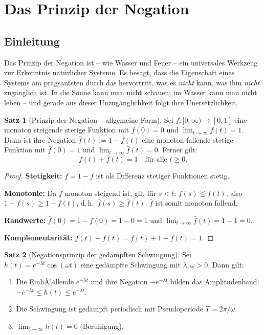 ﻿\documentclass[a4paper,12pt]{article}
\theoremstyle{definition}
\newtheorem{satz}{Satz}
\begin{document}
\section{Das Prinzip der Negation}
\label{sec:negation}

\subsection{Einleitung}

Das Prinzip der Negation ist -- wie Wasser und Feuer -- ein universales Werkzeug
zur Erkenntnis nat\"urlicher Systeme. Es besagt, dass die Eigenschaft eines Systems
am pr\"agsantsten durch das hervortritt, was es \emph{nicht} kann, was ihm
\emph{nicht} zug\"anglich ist. In die Sonne kann man nicht schauen; im Wasser kann
man nicht leben -- und gerade aus dieser Unzug\"anglichkeit folgt ihre Unersetzlichkeit.

\begin{satz}[Prinzip der Negation -- allgemeine Form]
\label{satz:negation}
    Sei $f : [0,\infty) \to [0,1]$ eine monoton steigende stetige Funktion mit
    $f(0) = 0$ und $\lim_{t\to\infty} f(t) = 1$. Dann ist ihre Negation
    $\bar{f}(t) := 1 - f(t)$ eine monoton fallende stetige Funktion mit
    $\bar{f}(0) = 1$ und $\lim_{t\to\infty} \bar{f}(t) = 0$. Ferner gilt:
    \[
        f(t) + \bar{f}(t) = 1 \quad \text{f\"ur alle } t \geq 0.
    \]
\end{satz}

\begin{proof}
    \textbf{Stetigkeit:} $\bar{f} = 1 - f$ ist als Differenz stetiger Funktionen stetig.

    \textbf{Monotonie:} Da $f$ monoton steigend ist, gilt f\"ur $s < t$:
    $f(s) \leq f(t)$, also $1 - f(s) \geq 1 - f(t)$, d.\,h.\ $\bar{f}(s) \geq \bar{f}(t)$.
    $\bar{f}$ ist somit monoton fallend.

    \textbf{Randwerte:} $\bar{f}(0) = 1 - f(0) = 1 - 0 = 1$ und
    $\lim_{t\to\infty}\bar{f}(t) = 1 - 1 = 0$.

    \textbf{Komplementarit\"at:} $f(t) + \bar{f}(t) = f(t) + 1 - f(t) = 1$. \qedhere
\end{proof}

\begin{satz}[Negationsprinzip der ged\"ampften Schwingung]
\label{satz:gedaempft}
    Sei $h(t) = e^{-\lambda t}\cos(\omega t)$ eine ged\"ampfte Schwingung mit
    $\lambda, \omega > 0$. Dann gilt:
    \begin{enumerate}
        \item Die EinhÃ¼llende $e^{-\lambda t}$ und ihre Negation $-e^{-\lambda t}$
              bilden das Amplitudenband: $-e^{-\lambda t} \leq h(t) \leq e^{-\lambda t}$.
        \item Die Schwingung ist ged\"ampft periodisch mit Pseudoperiode $T = 2\pi/\omega$.
        \item $\lim_{t\to\infty} h(t) = 0$ (Beruhigung).
    \end{enumerate}
\end{satz}
\end{document}
